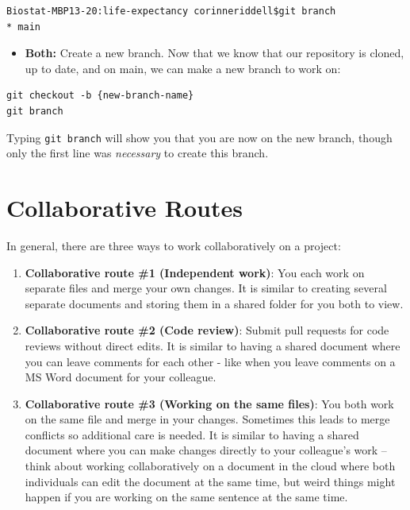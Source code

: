 \documentclass[
]{book}
\providecommand{\tightlist}{%
  \setlength{\itemsep}{0pt}\setlength{\parskip}{0pt}}
\begin{document}
\begin{verbatim}
Biostat-MBP13-20:life-expectancy corinneriddell$git branch
* main
\end{verbatim}

\begin{itemize}
\tightlist
\item
  \textbf{Both:} Create a new branch. Now that we know that our repository is cloned,
  up to date, and on main, we can make a new branch to work on:
\end{itemize}

\begin{verbatim}
git checkout -b {new-branch-name}
git branch
\end{verbatim}

Typing \texttt{git\ branch} will show you that you are now on the new branch, though
only the first line was \emph{necessary} to create this branch.

\section{Collaborative Routes}\label{collaborative-routes}

In general, there are three ways to work collaboratively on a project:

\begin{enumerate}
\def\labelenumi{\arabic{enumi}.}
\tightlist
\item
  \textbf{Collaborative route \#1 (Independent work)}: You each work on separate files and merge your own changes. It is similar to creating several separate documents and
  storing them in a shared folder for you both to view.\\
\item
  \textbf{Collaborative route \#2 (Code review)}: Submit pull requests for code reviews without direct edits. It is similar to having a shared document where you can leave comments for each other - like when you leave comments on a MS Word document for your colleague.\\
\item
  \textbf{Collaborative route \#3 (Working on the same files)}: You both work on the same file and merge in your changes. Sometimes this leads to merge conflicts so additional care is needed. It is similar to having a shared document where you
  can make changes directly to your colleague's work -- think about working collaboratively on a document in the cloud where both individuals can edit the
  document at the same time, but weird things might happen if you are working on the same sentence at the same time.
\end{enumerate}
\end{document}

